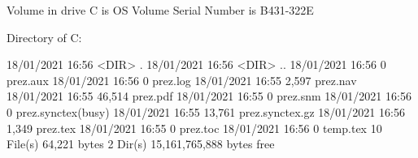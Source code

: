  Volume in drive C is OS
 Volume Serial Number is B431-322E

 Directory of C:\Users\ricca\prog\parall\vids\numbers

18/01/2021  16:56    <DIR>          .
18/01/2021  16:56    <DIR>          ..
18/01/2021  16:56                 0 prez.aux
18/01/2021  16:56                 0 prez.log
18/01/2021  16:55             2,597 prez.nav
18/01/2021  16:55            46,514 prez.pdf
18/01/2021  16:55                 0 prez.snm
18/01/2021  16:56                 0 prez.synctex(busy)
18/01/2021  16:55            13,761 prez.synctex.gz
18/01/2021  16:56             1,349 prez.tex
18/01/2021  16:55                 0 prez.toc
18/01/2021  16:56                 0 temp.tex
              10 File(s)         64,221 bytes
               2 Dir(s)  15,161,765,888 bytes free
